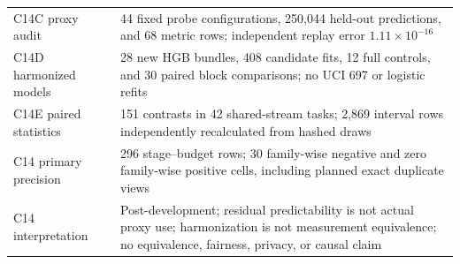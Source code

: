 \begin{table}[htbp]
\begin{tabularx}{\textwidth}{>{\raggedright\arraybackslash}p{} X}
C14C proxy audit & 44 fixed probe configurations, 250,044 held-out predictions, and 68 metric rows; independent replay error $1.11\times10^{-16}$ \\
C14D harmonized models & 28 new HGB bundles, 408 candidate fits, 12 full controls, and 30 paired block comparisons; no UCI 697 or logistic refits \\
C14E paired statistics & 151 contrasts in 42 shared-stream tasks; 2,869 interval rows independently recalculated from hashed draws \\
C14 primary precision & 296 stage--budget rows; 30 family-wise negative and zero family-wise positive cells, including planned exact duplicate views \\
C14 interpretation & Post-development; residual predictability is not actual proxy use; harmonization is not measurement equivalence; no equivalence, fairness, privacy, or causal claim \\
\bottomrule
\end{tabularx}
\end{table}
\FloatBarrier
